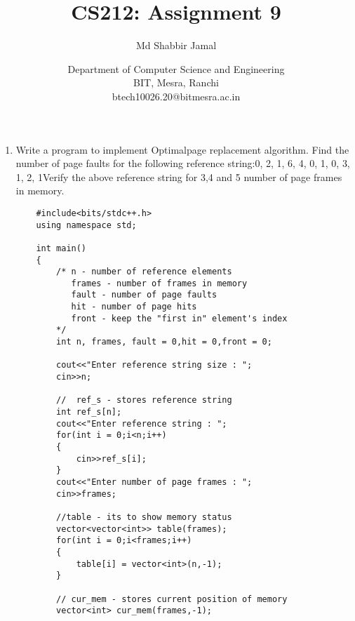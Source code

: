 \documentclass{article}
\title{CS212: Assignment 9}
\author{Md Shabbir Jamal}
\date{Department of Computer Science and Engineering\\
BIT, Mesra, Ranchi\\
btech10026.20@bitmesra.ac.in
}
\begin{document}
\maketitle

\begin{enumerate}
    
\item {{\large Write a program to implement Optimalpage replacement algorithm. Find the number of page faults for the following reference string:0, 2, 1, 6, 4, 0, 1, 0, 3, 1, 2, 1Verify the above reference string for 3,4 and 5 number of page frames in memory.}
\begin{verbatim}
    #include<bits/stdc++.h>
    using namespace std;
    
    int main()
    {
        /* n - number of reference elements
           frames - number of frames in memory
           fault - number of page faults
           hit - number of page hits
           front - keep the "first in" element's index
        */
        int n, frames, fault = 0,hit = 0,front = 0;
    
        cout<<"Enter reference string size : ";
        cin>>n;
    
        //  ref_s - stores reference string
        int ref_s[n];
        cout<<"Enter reference string : ";
        for(int i = 0;i<n;i++)
        {
            cin>>ref_s[i];
        }
        cout<<"Enter number of page frames : ";
        cin>>frames;
    
        //table - its to show memory status
        vector<vector<int>> table(frames);
        for(int i = 0;i<frames;i++)
        {
            table[i] = vector<int>(n,-1);
        }
    
        // cur_mem - stores current position of memory
        vector<int> cur_mem(frames,-1);
    

\end{verbatim}}
\end{enumerate}
\end{document}
